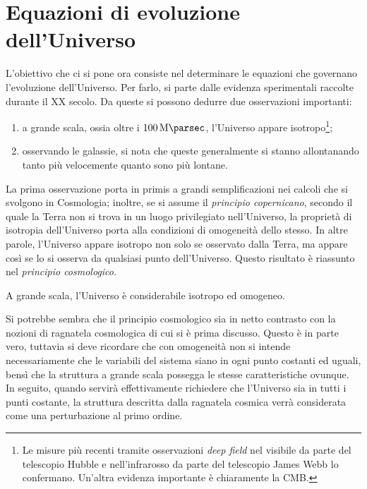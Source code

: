 \chapter{Equazioni di evoluzione dell'Universo}
L'obiettivo che ci si pone ora consiste nel determinare le equazioni che governano l'evoluzione dell'Universo. Per farlo, si parte dalle evidenza sperimentali raccolte durante il XX secolo. Da queste si possono dedurre due osservazioni importanti:
\begin{enumerate}
    \item a grande scala, ossia oltre i $\SI{100}{\mega\parsec}$, l'Universo appare isotropo\footnote{Le misure più recenti tramite osservazioni \emph{deep field} nel visibile da parte del telescopio Hubble e nell'infrarosso da parte del telescopio James Webb lo confermano. Un'altra evidenza importante è chiaramente la CMB.};
    \item osservando le galassie, si nota che queste generalmente si stanno allontanando tanto più velocemente quanto sono più lontane. 
\end{enumerate}
La prima osservazione porta in primis a grandi semplificazioni nei calcoli che si svolgono in Cosmologia; inoltre, se si assume il \emph{principio copernicano}, secondo il quale la Terra non si trova in un luogo privilegiato nell'Universo, la proprietà di isotropia dell'Universo porta alla condizioni di omogeneità dello stesso. In altre parole, l'Universo appare isotropo non solo se osservato dalla Terra, ma appare così se lo si osserva da qualsiasi punto dell'Universo. Questo risultato è riassunto nel \emph{principio cosmologico}.
\begin{axiom}
    A grande scala, l'Universo è considerabile isotropo ed omogeneo.
\end{axiom}
Si potrebbe sembra che il principio cosmologico sia in netto contrasto con la nozioni di ragnatela cosmologica di cui si è prima discusso. Questo è in parte vero, tuttavia si deve ricordare che con omogeneità non si intende necessariamente che le variabili del sistema siano in ogni punto costanti ed uguali, bensì che la struttura a grande scala possegga le stesse caratteristiche ovunque. In seguito, quando servirà effettivamente richiedere che l'Universo sia in tutti i punti costante, la struttura descritta dalla ragnatela cosmica verrà considerata come una perturbazione al primo ordine. 

